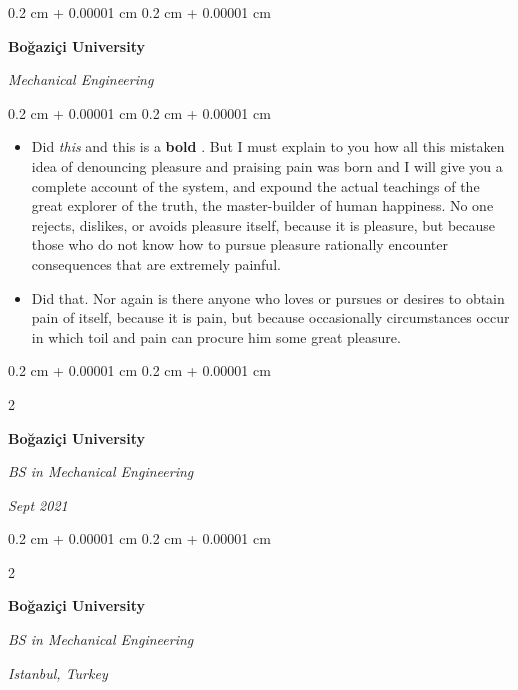 \documentclass[10pt, letterpaper]{article}
\newenvironment{highlights}{
    \begin{itemize}[
        topsep=0.10 cm,
        parsep=0.10 cm,
        partopsep=0pt,
        itemsep=0pt,
        leftmargin=0.4 cm + 10pt
    ]
}{
    \end{itemize}
} %
\newenvironment{onecolentry}{
    \begin{adjustwidth}{
        0.2 cm + 0.00001 cm
    }{
        0.2 cm + 0.00001 cm
    }
}{
    \end{adjustwidth}
} %
\newenvironment{twocolentry}[2][]{
    \onecolentry
    \def\secondColumn{#2}
    \setcolumnwidth{\fill, 4.5 cm}
    \begin{paracol}{2}
}{
    \switchcolumn \raggedleft \secondColumn
    \end{paracol}
    \endonecolentry
} %
\let\hrefWithoutArrow\href
\renewcommand{\href}[2]{\hrefWithoutArrow{#1}{\ifthenelse{\equal{#2}{}}{ }{#2 }\raisebox{.15ex}{\footnotesize \faExternalLink*}}}
\begin{document}
        \vspace{0.2 cm}

        \begin{onecolentry}
            \textbf{Boğaziçi University}

            \textit{Mechanical Engineering}
        \end{onecolentry}
        \vspace{0.10 cm}
        \begin{onecolentry}
            \begin{highlights}
                \item Did \textit{this} and this is a \textbf{bold} \href{https://example.com}{link}. But I must explain to you how all this mistaken idea of denouncing pleasure and praising pain was born and I will give you a complete account of the system, and expound the actual teachings of the great explorer of the truth, the master-builder of human happiness. No one rejects, dislikes, or avoids pleasure itself, because it is pleasure, but because those who do not know how to pursue pleasure rationally encounter consequences that are extremely painful.
                \item Did that. Nor again is there anyone who loves or pursues or desires to obtain pain of itself, because it is pain, but because occasionally circumstances occur in which toil and pain can procure him some great pleasure.
            \end{highlights}
        \end{onecolentry}


        \vspace{0.2 cm}

        \begin{twocolentry}{
            
            
        \textit{Sept 2021}}
            \textbf{Boğaziçi University}

            \textit{BS in Mechanical Engineering}
        \end{twocolentry}


        \vspace{0.2 cm}

        \begin{twocolentry}{
        \textit{Istanbul, Turkey}    
            
        }
            \textbf{Boğaziçi University}

            \textit{BS in Mechanical Engineering}
        \end{twocolentry}
\end{document}
